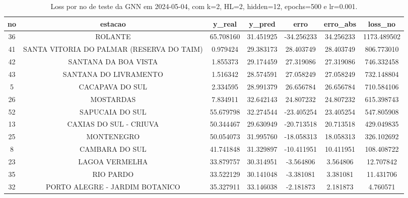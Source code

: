 \begin{table}[h]
\centering
\caption{Loss por no de teste da GNN em 2024-05-04, com k=2, HL=2, hidden=12, epochs=500 e lr=0.001.}
\label{tab:gnn_loss_k2_hl2_h12_e500_d20240504}
\begin{tabular}{ccccccc}
\toprule
no & estacao & y\_real & y\_pred & erro & erro\_abs & loss\_no \\
\midrule
36 & ROLANTE & 65.708160 & 31.451925 & -34.256233 & 34.256233 & 1173.489502 \\
41 & SANTA VITORIA DO PALMAR (RESERVA DO TAIM) & 0.979424 & 29.383173 & 28.403749 & 28.403749 & 806.773010 \\
42 & SANTANA DA BOA VISTA & 1.855373 & 29.174459 & 27.319086 & 27.319086 & 746.332458 \\
43 & SANTANA DO LIVRAMENTO & 1.516342 & 28.574591 & 27.058249 & 27.058249 & 732.148804 \\
5 & CACAPAVA DO SUL & 2.334595 & 28.991379 & 26.656784 & 26.656784 & 710.584106 \\
26 & MOSTARDAS & 7.834911 & 32.642143 & 24.807232 & 24.807232 & 615.398743 \\
52 & SAPUCAIA DO SUL & 55.679798 & 32.274544 & -23.405254 & 23.405254 & 547.805908 \\
13 & CAXIAS DO SUL - CRIUVA & 50.344467 & 29.630949 & -20.713518 & 20.713518 & 429.049835 \\
25 & MONTENEGRO & 50.054073 & 31.995760 & -18.058313 & 18.058313 & 326.102692 \\
8 & CAMBARA DO SUL & 41.741848 & 31.329897 & -10.411951 & 10.411951 & 108.408722 \\
23 & LAGOA VERMELHA & 33.879757 & 30.314951 & -3.564806 & 3.564806 & 12.707842 \\
35 & RIO PARDO & 33.522129 & 30.141048 & -3.381081 & 3.381081 & 11.431706 \\
32 & PORTO ALEGRE - JARDIM BOTANICO & 35.327911 & 33.146038 & -2.181873 & 2.181873 & 4.760571 \\
\bottomrule
\end{tabular}
\end{table}
